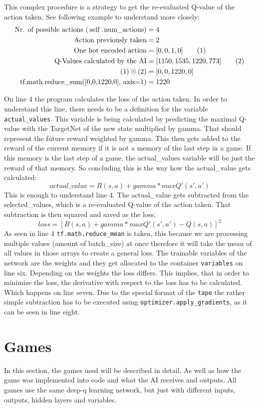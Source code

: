 \documentclass[12pt]{article}
\def\gamma{gamma}%
\begin{document}
This complex procedure is a strategy to get the re-evaluated Q-value of the action taken. See following example to understand more closely:
\begin{align}
    \text{Nr. of possible actions (\lstinline{self.num_actions})} &= 4 \notag\\    
    \text{Action previously taken} &= 2 \notag\\
    \text{One hot encoded action} &= [0,0,1,0] \tag{1}\\
    \text{Q-Values calculated by the AI} &= [1150, 1535, 1220, 773] \tag{2}\\
    (1)\odot(2) &= [0,0,1220,0] \notag\\
    \text{tf.math.reduce\_sum([0,0,1220,0], axis=1)} &= 1220\notag
\end{align}

On line 4 the program calculates the loss of the action taken. In order to understand this line, there needs to be a definition for the variable \lstinline{actual_values}. This variable is being calculated by predicting the maximal Q-value with the TargetNet of the new state multiplied by gamma. That should represent the future reward weighted by gamma. This then gets added to the reward of the current memory if it is not a memory of the last step in a game. If this memory is the last step of a game, the actual\_values variable will be just the reward of that memory. So concluding this is the way how the actual\_value gets calculated:
\[actual\_value = R(s, a) + \gamma * maxQ'(s', a')\]
This is enough to understand line 4. The actual\_value gets subtracted from the selected\_values, which is a re-evaluated Q-value of the action taken. That subtraction is then squared and saved as the loss: 
\[loss = [R(s, a) + \gamma * maxQ'(s', a') - Q(s, a)]^2 \]
As seen in line 4 \lstinline{tf.math.reduce_mean} is taken, this because we are processing multiple values (amount of batch\_size) at once therefore it will take the mean of all values in those arrays to create a general loss.
The trainable variables of the network are the weights and they get allocated to the container \lstinline{variables} on line six. Depending on the weights the loss differs. This implies, that in order to minimize the loss, the derivative with respect to the loss has to be calculated.  Which happens on line seven. Due to the special format of the \lstinline{tape} the rather simple subtraction has to be executed using \lstinline{optimizer.apply_gradients}, as it can be seen in line eight.\cite{tf.keras.optimizers}
\section{Games}\label{sec:Games}
In this section, the games used will be described in detail. As well as how the game was implemented into code and what the AI receives and outputs. All games use the same deep-q learning network, but just with different inputs, outputs, hidden layers and variables.
\end{document}

